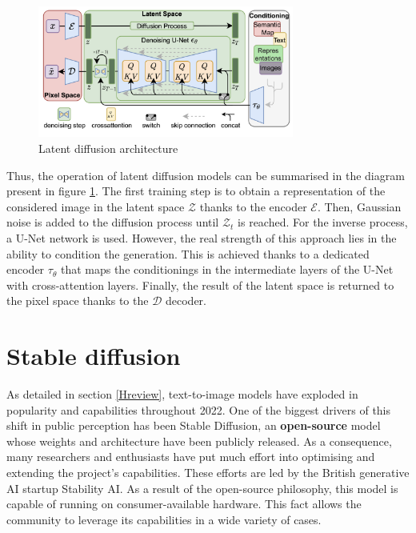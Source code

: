\begin{figure}
    \centering
    \includegraphics[width=0.75\textwidth]{Pictures/LDMDiagram.png} 
    \caption{Latent diffusion architecture}
    \label{fig:LDMDiagram}
\end{figure}

Thus, the operation of latent diffusion models can be summarised in the diagram present in figure \ref{fig:LDMDiagram}. The first training step is to obtain a representation of the considered image in the latent space $\mathcal{Z}$ thanks to the encoder  $\mathcal{E}$. Then, Gaussian noise is added to the diffusion process until $\mathcal{Z}_t$ is reached. For the inverse process, a U-Net network is used. However, the real strength of this approach lies in the ability to condition the generation. This is achieved thanks to a dedicated encoder $\tau_\theta$ that maps the conditionings in the intermediate layers of the U-Net with cross-attention layers. Finally, the result of the latent space is returned to the pixel space thanks to the $\mathcal{D}$ decoder.

\section{Stable diffusion} \label{SD}

As detailed in section \ref{Hreview}, text-to-image models have exploded in popularity and capabilities throughout 2022. One of the biggest drivers of this shift in public perception has been Stable Diffusion, an \textbf{open-source} model whose weights and architecture have been publicly released. As a consequence, many researchers and enthusiasts have put much effort into optimising and extending the project's capabilities. These efforts are led by the British generative AI startup Stability AI. As a result of the open-source philosophy, this model is capable of running on consumer-available hardware. This fact allows the community to leverage its capabilities in a wide variety of cases.

